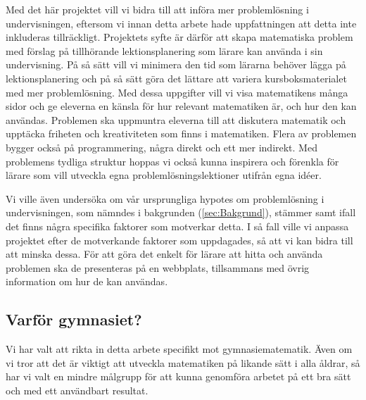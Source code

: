 \textcolor{lila}{Med det här projektet vill vi bidra till att införa mer problemlösning i undervisningen, eftersom vi innan detta arbete hade uppfattningen att detta inte inkluderas tillräckligt. Projektets syfte är därför att skapa matematiska problem med förslag på tillhörande lektionsplanering som lärare kan använda i sin undervisning.}
\textcolor{Mahogany}{På så sätt vill vi minimera den tid som lärarna behöver lägga på lektionsplanering och på så sätt göra det lättare att variera kursboksmaterialet med mer problemlösning.} 
\textcolor{lila}{Med dessa uppgifter vill vi visa matematikens många sidor och ge eleverna en känsla för hur relevant matematiken är, och hur den kan användas. Problemen ska uppmuntra eleverna till att diskutera matematik och upptäcka friheten och kreativiteten som finns i matematiken. Flera av problemen bygger också på programmering, några direkt och ett mer indirekt. Med problemens tydliga struktur hoppas vi också kunna inspirera och förenkla för lärare som vill utveckla egna problemlösningslektioner utifrån egna idéer.}

\textcolor{lila}{Vi ville även undersöka om vår ursprungliga hypotes om problemlösning i undervisningen, som nämndes i bakgrunden (\ref{sec:Bakgrund}), stämmer samt ifall det finns några specifika faktorer som motverkar detta. I så fall ville vi anpassa projektet efter de motverkande faktorer som uppdagades, så att vi kan bidra till att minska dessa. För att göra det enkelt för lärare att hitta och använda problemen ska de presenteras på en webbplats, tillsammans med övrig information om hur de kan användas.}


\subsection{Varför gymnasiet?}
\textcolor{lila}{
    Vi har valt att rikta in detta arbete specifikt mot gymnasiematematik. Även om vi tror att det är viktigt att utveckla matematiken på likande sätt i alla åldrar, så har vi valt en mindre målgrupp för att kunna genomföra arbetet på ett bra sätt och med ett användbart resultat. }
    
